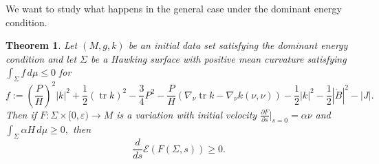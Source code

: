 \documentclass[12pt,a4paper]{amsart}
\theoremstyle{plain}
\newtheorem{theorem}{Theorem}[section]
\theoremstyle{definition}
\newcommand{\tr}{\operatorname{tr}}
\begin{document}
We want to study what happens in the general case under the dominant energy condition.
\begin{theorem}\label{monotinic0}
   Let $(M,g,k)$ be an initial data set  satisfying the dominant energy condition and let \( \Sigma \) be a Hawking surface with positive mean curvature satisfying  $\int_\Sigma f \, d\mu \leq 0$ for
    \begin{equation}
        f:= \left( \frac{P}{H}\right)^2|k|^2+ \frac{1}{2 }(\tr k)^2    - \frac{3}{4} P^2- \frac{P}{H}( \nabla_\nu \tr k - \nabla_\nu k(\nu,\nu )) -  \frac{1}{2} |k|^2  -\frac{1}{2} |\mathring{B}|^2 -|J|.
    \end{equation}
     Then if \( F : \Sigma \times [0, \varepsilon) \rightarrow M \) is a variation with initial velocity \( \frac{\partial F}{\partial s} \Big|_{s=0} = \alpha \nu \) and $\int_{\Sigma} \alpha H \, d\mu \geq 0,$ then 
\[
\frac{d}{ds} \mathcal{E}(F(\Sigma, s)) \geq 0.
\]
\end{theorem}
\end{document}
